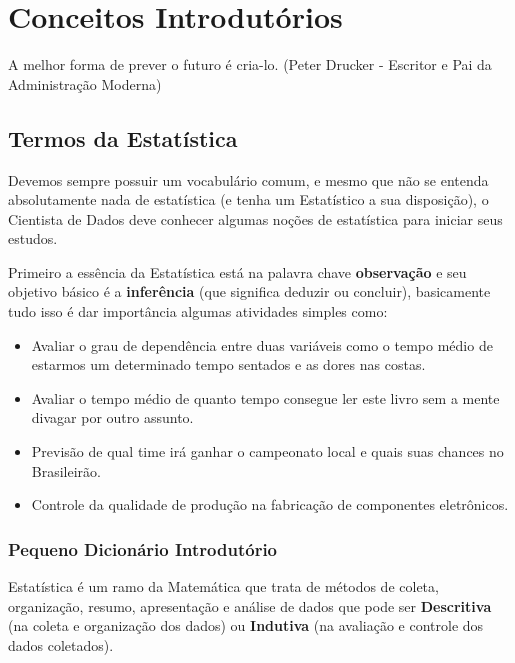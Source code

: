 \chapter{Conceitos Introdutórios}

\begin{remark}
A melhor forma de prever o futuro é cria-lo. (Peter Drucker - Escritor e Pai da Administração Moderna) 
\end{remark}

\section{Termos da Estatística}
Devemos sempre possuir um vocabulário comum, e mesmo que não se entenda absolutamente nada de estatística (e tenha um Estatístico a sua disposição), o Cientista de Dados deve conhecer algumas noções de estatística para iniciar seus estudos.

Primeiro a essência da Estatística está na palavra chave \textbf{observação} e seu objetivo básico é a \textbf{inferência} (que significa deduzir ou concluir), basicamente tudo isso é dar importância algumas atividades simples como:
\begin{itemize}
	\item Avaliar o grau de dependência entre duas variáveis como o tempo médio de estarmos um determinado tempo sentados e as dores nas costas.
	\item Avaliar o tempo médio de quanto tempo consegue ler este livro sem a mente divagar por outro assunto.
	\item Previsão de qual time irá ganhar o campeonato local e quais suas chances no Brasileirão.
	\item Controle da qualidade de produção na fabricação de componentes eletrônicos.
\end{itemize}

\subsection{Pequeno Dicionário Introdutório}
Estatística é um ramo da Matemática que trata de métodos de coleta, organização, resumo, apresentação e análise de dados que pode ser \textbf{Descritiva} (na coleta e organização dos dados) ou \textbf{Indutiva} (na avaliação e controle dos dados coletados).

